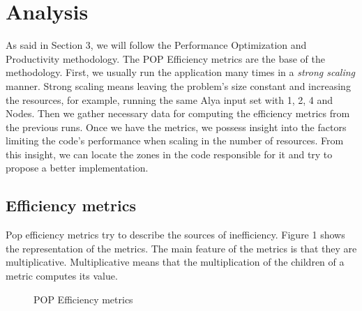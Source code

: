 \section{Analysis}

As said in Section 3, we will follow the Performance Optimization and Productivity\cite{popMethod} methodology. The POP Efficiency metrics are the base of the methodology. First, we usually run the application many times in a \textit{strong scaling} manner. Strong scaling means leaving the problem's size constant and increasing the resources, for example, running the same Alya input set with 1, 2, 4 and Nodes. Then we gather necessary data for computing the efficiency metrics from the previous runs. Once we have the metrics, we possess insight into the factors limiting the code's performance when scaling in the number of resources. From this insight, we can locate the zones in the code responsible for it and try to propose a better implementation.

\subsection{Efficiency metrics}

Pop efficiency metrics try to describe the sources of inefficiency. Figure 1 shows the representation of the metrics. The main feature of the metrics is that they are multiplicative. Multiplicative means that the multiplication of the children of a metric computes its value.

\begin{figure}[htbp]
\centering
{}
\caption{POP Efficiency metrics}
\label{popmet}
\end{figure}

